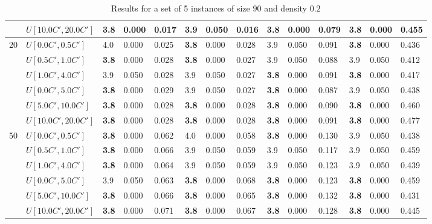 \begin{table}[h]
{\begin{tabular}{|l|l||l|l|l||l|l|l||l|l|l||l|l|l|}
       & $U[10.0C',20.0C']$ & \textbf{3.8} & 0.000 & 0.017 & 3.9 & 0.050 & 0.016 & \textbf{3.8} & 0.000 & 0.079 & \textbf{3.8} & 0.000 & 0.455 \\
      \hline\hline
      \multirow{6}{*}{20} & $U[0.0C',0.5C']$ & 4.0 & 0.000 & 0.025 & \textbf{3.8} & 0.000 & 0.028 & 3.9 & 0.050 & 0.091 & \textbf{3.8} & 0.000 & 0.436 \\
       & $U[0.5C',1.0C']$ & \textbf{3.8} & 0.000 & 0.028 & \textbf{3.8} & 0.000 & 0.027 & 3.9 & 0.050 & 0.088 & 3.9 & 0.050 & 0.412 \\
       & $U[1.0C',4.0C']$ & 3.9 & 0.050 & 0.028 & 3.9 & 0.050 & 0.027 & \textbf{3.8} & 0.000 & 0.091 & \textbf{3.8} & 0.000 & 0.417 \\
       & $U[0.0C',5.0C']$ & \textbf{3.8} & 0.000 & 0.029 & 3.9 & 0.050 & 0.027 & \textbf{3.8} & 0.000 & 0.087 & 3.9 & 0.050 & 0.438 \\
       & $U[5.0C',10.0C']$ & \textbf{3.8} & 0.000 & 0.028 & \textbf{3.8} & 0.000 & 0.028 & \textbf{3.8} & 0.000 & 0.090 & \textbf{3.8} & 0.000 & 0.460 \\
       & $U[10.0C',20.0C']$ & \textbf{3.8} & 0.000 & 0.028 & \textbf{3.8} & 0.000 & 0.028 & \textbf{3.8} & 0.000 & 0.091 & \textbf{3.8} & 0.000 & 0.477 \\
      \hline\hline
      \multirow{6}{*}{50} & $U[0.0C',0.5C']$ & \textbf{3.8} & 0.000 & 0.062 & 4.0 & 0.000 & 0.058 & \textbf{3.8} & 0.000 & 0.130 & 3.9 & 0.050 & 0.438 \\
       & $U[0.5C',1.0C']$ & \textbf{3.8} & 0.000 & 0.066 & 3.9 & 0.050 & 0.059 & 3.9 & 0.050 & 0.117 & 3.9 & 0.050 & 0.459 \\
       & $U[1.0C',4.0C']$ & \textbf{3.8} & 0.000 & 0.064 & 3.9 & 0.050 & 0.059 & 3.9 & 0.050 & 0.123 & 3.9 & 0.050 & 0.439 \\
       & $U[0.0C',5.0C']$ & 3.9 & 0.050 & 0.063 & \textbf{3.8} & 0.000 & 0.068 & \textbf{3.8} & 0.000 & 0.123 & \textbf{3.8} & 0.000 & 0.459 \\
       & $U[5.0C',10.0C']$ & \textbf{3.8} & 0.000 & 0.066 & \textbf{3.8} & 0.000 & 0.065 & \textbf{3.8} & 0.000 & 0.132 & \textbf{3.8} & 0.000 & 0.431 \\
       & $U[10.0C',20.0C']$ & \textbf{3.8} & 0.000 & 0.071 & \textbf{3.8} & 0.000 & 0.067 & \textbf{3.8} & 0.000 & 0.128 & \textbf{3.8} & 0.000 & 0.445 \\
      \hline
      \end{tabular}
      }
      \caption{Results for a set of 5 instances of size $90$ and density $0.2$}
      \label{tab:pcpn90p2}\end{table}
      
